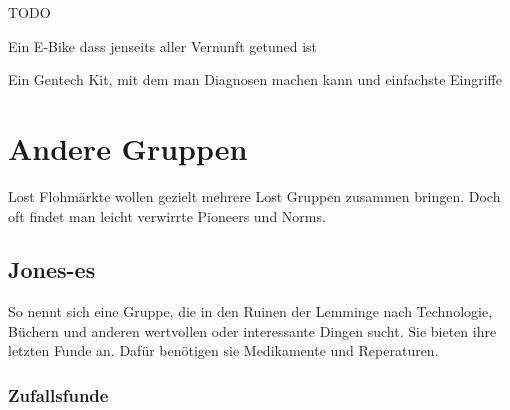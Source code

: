 \begin{npcBox}[title=Flash]
    \begin{stressSection}
    \end{stressSection}
    \begin{tabularx}{\textwidth}{ XX }
    \end{tabularx}

    \begin{consequences}
    \item {}
    \item {}
    \item {}
    \end{consequences}

    \begin{npcDescription}
    TODO
    \end{npcDescription}


    \begin{equipment}
    \item Ein E-Bike dass jenseits aller Vernunft getuned ist
    \item Ein Gentech Kit, mit dem man Diagnosen machen kann und einfachste Eingriffe
    \end{equipment}
\end{npcBox}
\newpage

\chapter{Andere Gruppen}

Lost Flohmärkte wollen gezielt mehrere Lost Gruppen zusammen bringen. Doch oft findet man leicht verwirrte Pioneers und Norms.

\section{Jones-es}

So nennt sich eine Gruppe, die in den Ruinen der Lemminge nach Technologie, Büchern und anderen wertvollen oder interessante Dingen sucht. Sie bieten ihre letzten Funde an. Dafür benötigen sie Medikamente und Reperaturen.

\subsection{Zufallsfunde}

